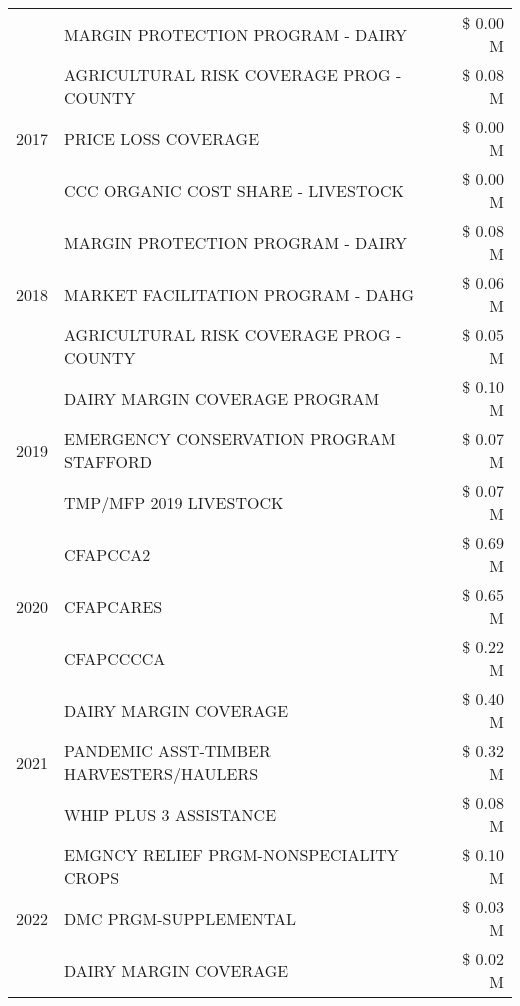 \begin{tabular}{llr}
 & MARGIN PROTECTION PROGRAM - DAIRY & \$ 0.00 M \\
\cline{1-3}
\multirow[t]{3}{*}{2017} & AGRICULTURAL RISK COVERAGE PROG - COUNTY & \$ 0.08 M \\
 & PRICE LOSS COVERAGE & \$ 0.00 M \\
 & CCC ORGANIC COST SHARE - LIVESTOCK & \$ 0.00 M \\
\cline{1-3}
\multirow[t]{3}{*}{2018} & MARGIN PROTECTION PROGRAM - DAIRY & \$ 0.08 M \\
 & MARKET FACILITATION PROGRAM - DAHG & \$ 0.06 M \\
 & AGRICULTURAL RISK COVERAGE PROG - COUNTY & \$ 0.05 M \\
\cline{1-3}
\multirow[t]{3}{*}{2019} & DAIRY MARGIN COVERAGE PROGRAM & \$ 0.10 M \\
 & EMERGENCY CONSERVATION PROGRAM STAFFORD & \$ 0.07 M \\
 & TMP/MFP 2019 LIVESTOCK & \$ 0.07 M \\
\cline{1-3}
\multirow[t]{3}{*}{2020} & CFAPCCA2 & \$ 0.69 M \\
 & CFAPCARES & \$ 0.65 M \\
 & CFAPCCCCA & \$ 0.22 M \\
\cline{1-3}
\multirow[t]{3}{*}{2021} & DAIRY MARGIN COVERAGE & \$ 0.40 M \\
 & PANDEMIC ASST-TIMBER HARVESTERS/HAULERS & \$ 0.32 M \\
 & WHIP PLUS 3 ASSISTANCE & \$ 0.08 M \\
\cline{1-3}
\multirow[t]{3}{*}{2022} & EMGNCY RELIEF PRGM-NONSPECIALITY CROPS & \$ 0.10 M \\
 & DMC PRGM-SUPPLEMENTAL & \$ 0.03 M \\
 & DAIRY MARGIN COVERAGE & \$ 0.02 M \\
\cline{1-3}
\bottomrule
\end{tabular}
